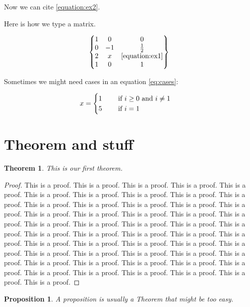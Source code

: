 \documentclass{article}
\newtheorem{thm}{Theorem}[section]
\newtheorem{prop}{Proposition}
\theoremstyle{definition}
\theoremstyle{remark}
\begin{document}
Now we can cite \eqref{equation:ex2}.

Here is how we type a matrix.

$$
\left\{ \begin{matrix}
1 & 0 & 0 \\
0 & -1 & \frac12 \\
2 & x & \eqref{equation:ex1} \\
1 & 0 & 1
\end{matrix} \right\}
$$

Sometimes we might need cases in an equation \eqref{eq:cases}:

\begin{equation}\label{eq:cases}
x = \begin{cases} 1 \quad\quad \hbox{ if } i \geq 0 \hbox{ and } i\neq 1 \\
5 \quad\quad \hbox{ if $i=1$}
\end{cases}
\end{equation}

\section{Theorem and stuff}

\begin{thm}\label{thm:main}
This is our first theorem.
\end{thm}

\begin{proof}
This is a proof. This is a proof. This is a proof. This is a proof. This is a proof. This is a proof. This is a proof. This is a proof. This is a proof. This is a proof. This is a proof. This is a proof. This is a proof. This is a proof. This is a proof. This is a proof. This is a proof. This is a proof. This is a proof. This is a proof. This is a proof. This is a proof. This is a proof. This is a proof. This is a proof. This is a proof. This is a proof. This is a proof. This is a proof. This is a proof. This is a proof. This is a proof. This is a proof. This is a proof. This is a proof. This is a proof. This is a proof. This is a proof. This is a proof. This is a proof. This is a proof. This is a proof. This is a proof. This is a proof. This is a proof. This is a proof. This is a proof. This is a proof. This is a proof. This is a proof. This is a proof. 
\end{proof}

\begin{prop}
A proposition is usually a Theorem that might be too easy.
\end{prop}
\end{document}
